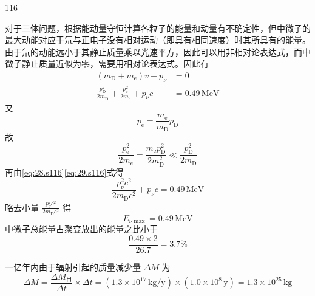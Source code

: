 \begin{solution}{116}
\begin{subsolution}
        对于三体问题，根据能动量守恒计算各粒子的能量和动量有不确定性，但中微子的最大动能对应于氘与正电子没有相对运动（即具有相同速度）时其所具有的能量。由于氘的动能远小于其静止质量乘以光速平方，因此可以用非相对论表达式，而中微子静止质量近似为零，需要用相对论表达式。因此有
        \begin{align}
            (m_{\mathrm{D}} + m_{\mathrm{e}}) v - p_{\nu} &= 0 \label{eq:28.s116} \\
            \frac{p_{\mathrm{D}}^{2}}{2 m_{\mathrm{D}}} + \frac{p_{\mathrm{e}}^{2}}{2 m_{\mathrm{e}}} + p_{\nu} c &= 0.49 \,\mathrm{MeV} \label{eq:29.s116}
        \end{align}
        又
        \begin{equation}
            p_{\mathrm{e}} = \frac{m_{\mathrm{e}}}{m_{\mathrm{D}}} p_{\mathrm{D}}
        \end{equation}
        故
        \begin{equation}
            \frac{p_{\mathrm{e}}^{2}}{2 m_{\mathrm{e}}} = \frac{m_{\mathrm{e}} p_{\mathrm{D}}^{2}}{2 m_{\mathrm{D}}^{2}} \ll \frac{p_{\mathrm{D}}^{2}}{2 m_{\mathrm{D}}}
        \end{equation}
        再由\eqref{eq:28.s116}\eqref{eq:29.s116}式得
        \begin{equation}
            \frac{p_{\nu}^{2} c^{2}}{2 m_{\mathrm{D}} c^{2}} + p_{\nu} c = 0.49 \,\mathrm{MeV}
        \end{equation}
        略去小量 $\frac{p_{\nu}^{2}c^{2}}{2m_{\mathrm{D}}c^{2}}$ 得
        \begin{equation}
            E_{\nu \max} = 0.49 \,\mathrm{MeV}
            \label{eq:30.s116}
        \end{equation}
        中微子总能量占聚变放出的能量之比小于
        \begin{equation}
            \frac{0.49 \times 2}{26.7} = 3.7\%
            \label{eq:31.s116}
        \end{equation}
    \end{subsolution}
    \begin{subsolution}
        \begin{subsubsolution}
            一亿年内由于辐射引起的质量减少量 $\Delta M$ 为
            \begin{equation}
                \Delta M = \frac{\Delta M_{\text{日}}}{\Delta t} \times \Delta t = (1.3 \times 10^{17} \,\mathrm{kg/y}) \times (1.0 \times 10^{8} \,\mathrm{y}) = 1.3 \times 10^{25} \,\mathrm{kg}
                \label{eq:32.s116}
            \end{equation}

\end{subsubsolution}
\end{subsolution}
\end{solution}
